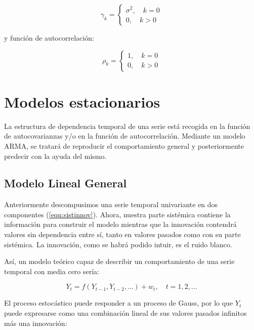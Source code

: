\documentclass[a4paper,10pt]{article}
\begin{document}
\begin{equation*}
\gamma_k= \left\{ \begin{array}{lcc}
             \sigma^2, \quad k=0 \\
             0, \quad k > 0
             \end{array}
   \right.
\end{equation*}

y función de autocorrelación:

\begin{equation*}
\rho_k= \left\{ \begin{array}{lcc}
             1, \quad k=0 \\
             0, \quad k > 0
             \end{array}
   \right.
\end{equation*}

\section{Modelos estacionarios}

La estructura de dependencia temporal de una serie está recogida en la función de autocovarianzas y/o en la función de autocorrelación. Mediante un modelo ARMA, se tratará de reproducir el comportamiento general y posteriormente predecir con la ayuda del mismo.

\subsection{Modelo Lineal General}

Anteriormente descompusimos una serie temporal univariante en dos componentes (\ref{eqn:sistinnov}). Ahora, nuestra parte sistémica contiene la información para construir el modelo mientras que la innovación contendrá valores sin dependencia entre sí, tanto en valores pasados como con su parte sistémica. La innovación, como se habrá podido intuir, es el ruido blanco.

Así, un modelo teórico capaz de describir un comportamiento de una serie temporal con media cero sería:

\begin{equation}
Y_t = f(Y_{t-1},Y_{t-2},...) + w_t, \quad t=1,2,...
\end{equation}

El proceso estocástico puede responder a un proceso de Gauss, por lo que $Y_t$ puede expresarse como una combinación lineal de sus valores pasados infinitos más una innovación:
\end{document}
